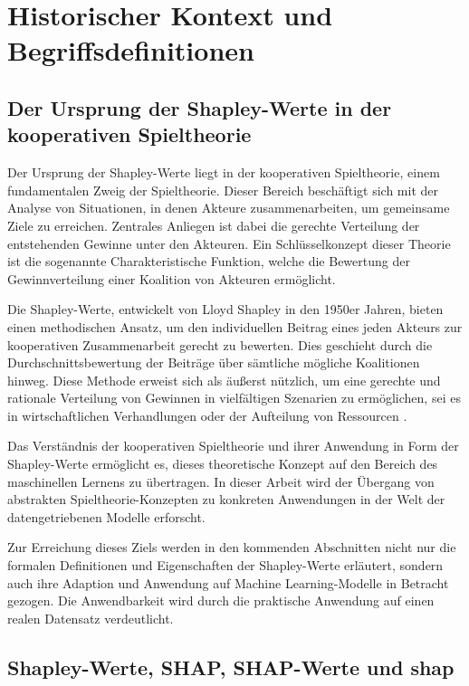 \chapter{Historischer Kontext und Begriffsdefinitionen}



\section{Der Ursprung der Shapley-Werte in der kooperativen Spieltheorie}

Der Ursprung der Shapley-Werte liegt in der kooperativen Spieltheorie, einem fundamentalen Zweig der Spieltheorie. 
Dieser Bereich beschäftigt sich mit der Analyse von Situationen, in denen Akteure zusammenarbeiten, um gemeinsame Ziele zu erreichen. 
Zentrales Anliegen ist dabei die gerechte Verteilung der entstehenden Gewinne unter den Akteuren. Ein Schlüsselkonzept dieser Theorie 
ist die sogenannte \glqq{}Charakteristische Funktion\grqq{}, welche die Bewertung der Gewinnverteilung einer Koalition von Akteuren ermöglicht.

Die Shapley-Werte, entwickelt von Lloyd Shapley in den 1950er Jahren, bieten einen methodischen Ansatz, um den individuellen Beitrag 
eines jeden Akteurs zur kooperativen Zusammenarbeit gerecht zu bewerten. Dies geschieht durch die Durchschnittsbewertung der Beiträge 
über sämtliche mögliche Koalitionen hinweg. Diese Methode erweist sich als äußerst nützlich, um eine gerechte und rationale Verteilung 
von Gewinnen in vielfältigen Szenarien zu ermöglichen, sei es in wirtschaftlichen Verhandlungen oder der Aufteilung von Ressourcen \cite[S. 7]{Molnar_2023}.

Das Verständnis der kooperativen Spieltheorie und ihrer Anwendung in Form der Shapley-Werte ermöglicht es, dieses theoretische Konzept 
auf den Bereich des maschinellen Lernens zu übertragen. In dieser Arbeit wird der Übergang von abstrakten Spieltheorie-Konzepten 
zu konkreten Anwendungen in der Welt der datengetriebenen Modelle erforscht.

Zur Erreichung dieses Ziels werden in den kommenden Abschnitten nicht nur die formalen Definitionen und Eigenschaften der Shapley-Werte 
erläutert, sondern auch ihre Adaption und Anwendung auf Machine Learning-Modelle in Betracht gezogen. Die Anwendbarkeit wird durch die 
praktische Anwendung auf einen realen Datensatz verdeutlicht.


\section{Shapley-Werte, SHAP, SHAP-Werte und \textsf{shap}}

